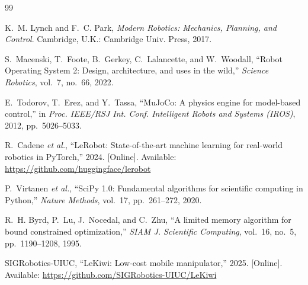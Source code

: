 \documentclass[letterpaper, 10 pt, conference]{ieeeconf}
\begin{document}
\begin{thebibliography}{99}

 K.~M. Lynch and F.~C. Park, \emph{Modern Robotics: Mechanics, Planning, and Control}.
Cambridge, U.K.: Cambridge Univ. Press, 2017.

 S.~Macenski, T.~Foote, B.~Gerkey, C.~Lalancette, and W.~Woodall, ``Robot Operating
System 2: Design, architecture, and uses in the wild,'' \emph{Science Robotics}, vol.~7, no.~66, 2022.

 E.~Todorov, T.~Erez, and Y.~Tassa, ``MuJoCo: A physics engine for model-based control,''
in \emph{Proc. IEEE/RSJ Int. Conf. Intelligent Robots and Systems (IROS)}, 2012, pp.~5026--5033.

 R.~Cadene \emph{et al.}, ``LeRobot: State-of-the-art machine learning for real-world
robotics in PyTorch,'' 2024. [Online]. Available: \url{https://github.com/huggingface/lerobot}

 P.~Virtanen \emph{et al.}, ``SciPy 1.0: Fundamental algorithms for scientific computing
in Python,'' \emph{Nature Methods}, vol.~17, pp.~261--272, 2020.

 R.~H. Byrd, P.~Lu, J.~Nocedal, and C.~Zhu, ``A limited memory algorithm for bound
constrained optimization,'' \emph{SIAM J. Scientific Computing}, vol.~16, no.~5, pp.~1190--1208, 1995.

 SIGRobotics-UIUC, ``LeKiwi: Low-cost mobile manipulator,'' 2025. [Online]. Available:
\url{https://github.com/SIGRobotics-UIUC/LeKiwi}

\end{thebibliography}
\end{document}
